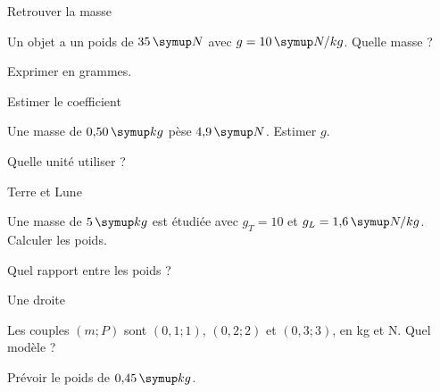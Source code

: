 \par\noindent\begin{minipage}{\linewidth}
\begin{exercice}[2]{Retrouver la masse}
\begin{questions}
\item Un objet a un poids de $35\unite N$ avec $g=10\unite{N/kg}$. Quelle masse ?
\item Exprimer en grammes.
\end{questions}
\end{exercice}
\end{minipage}
\par\noindent\begin{minipage}{\linewidth}
\begin{exercice}[2]{Estimer le coefficient}
\begin{questions}
\item Une masse de $0{,}50\unite{kg}$ pèse $4{,}9\unite N$. Estimer $g$.
\item Quelle unité utiliser ?
\end{questions}
\end{exercice}
\end{minipage}
\par\noindent\begin{minipage}{\linewidth}
\begin{exercice}[2]{Terre et Lune}
\begin{questions}
\item Une masse de $5\unite{kg}$ est étudiée avec $g_T=10$ et $g_L=1{,}6\unite{N/kg}$. Calculer les poids.
\item Quel rapport entre les poids ?
\end{questions}
\end{exercice}
\end{minipage}
\par\noindent\begin{minipage}{\linewidth}
\begin{exercice}[2]{Une droite}
\begin{questions}
\item Les couples $(m;P)$ sont $(0{,}1;1)$, $(0{,}2;2)$ et $(0{,}3;3)$, en kg et N. Quel modèle ?
\item Prévoir le poids de $0{,}45\unite{kg}$.
\end{questions}
\end{exercice}
\end{minipage}
\clearpage{}
